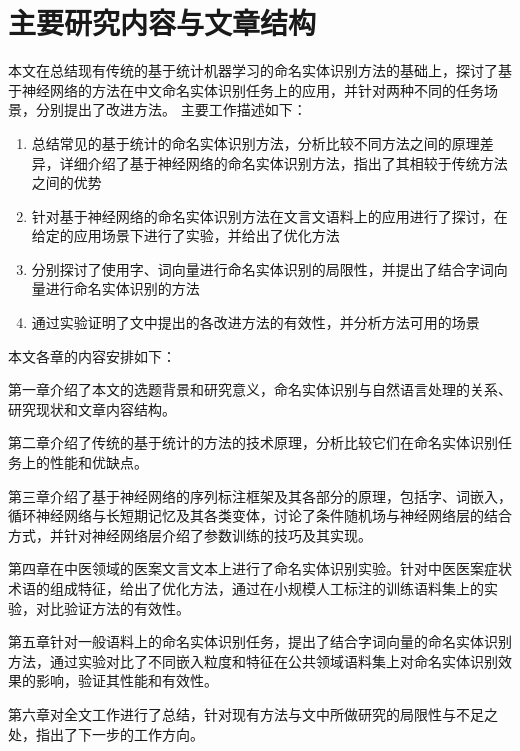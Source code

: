 \section{主要研究内容与文章结构}
本文在总结现有传统的基于统计机器学习的命名实体识别方法的基础上，探讨了基于神经网络的方法在中文命名实体识别任务上的应用，并针对两种不同的任务场景，分别提出了改进方法。
主要工作描述如下：
\begin{enumerate}[\indent(1)]
    \item 总结常见的基于统计的命名实体识别方法，分析比较不同方法之间的原理差异，详细介绍了基于神经网络的命名实体识别方法，指出了其相较于传统方法之间的优势
    \item 针对基于神经网络的命名实体识别方法在文言文语料上的应用进行了探讨，在给定的应用场景下进行了实验，并给出了优化方法
    \item 分别探讨了使用字、词向量进行命名实体识别的局限性，并提出了结合字词向量进行命名实体识别的方法
    \item 通过实验证明了文中提出的各改进方法的有效性，并分析方法可用的场景
\end{enumerate}

本文各章的内容安排如下：

第一章介绍了本文的选题背景和研究意义，命名实体识别与自然语言处理的关系、研究现状和文章内容结构。

第二章介绍了传统的基于统计的方法的技术原理，分析比较它们在命名实体识别任务上的性能和优缺点。

第三章介绍了基于神经网络的序列标注框架及其各部分的原理，包括字、词嵌入，循环神经网络与长短期记忆及其各类变体，讨论了条件随机场与神经网络层的结合方式，并针对神经网络层介绍了参数训练的技巧及其实现。

第四章在中医领域的医案文言文本上进行了命名实体识别实验。针对中医医案症状术语的组成特征，给出了优化方法，通过在小规模人工标注的训练语料集上的实验，对比验证方法的有效性。

第五章针对一般语料上的命名实体识别任务，提出了结合字词向量的命名实体识别方法，通过实验对比了不同嵌入粒度和特征在公共领域语料集上对命名实体识别效果的影响，验证其性能和有效性。

第六章对全文工作进行了总结，针对现有方法与文中所做研究的局限性与不足之处，指出了下一步的工作方向。
